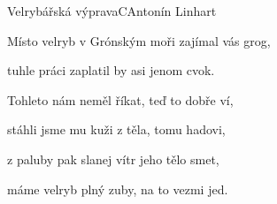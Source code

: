 \begin{song}{Velrybářská výprava}{C}{Antonín Linhart}
\begin{SBVerse}
Místo velryb v Grónským moři zajímal vás grog,

tuhle práci zaplatil by asi jenom cvok.

\end{SBVerse}

\begin{SBVerse}

Tohleto nám neměl říkat, teď to dobře ví,

stáhli jsme mu kuži z těla, tomu hadovi,

z paluby pak slanej vítr jeho tělo smet,

máme velryb plný zuby, na to vezmi jed.

\end{SBVerse}

\end{song}

\pagebreak
